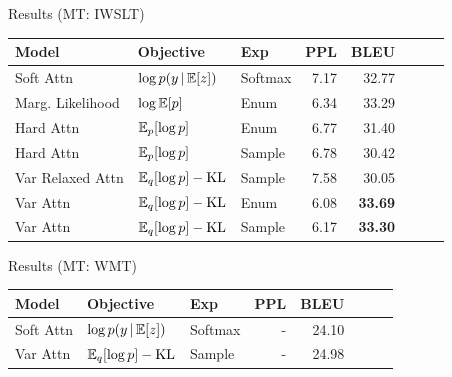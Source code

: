\begin{frame}{Results (MT: IWSLT)}
\begin{table}
  \centering
  \begin{tabular}{lllrrrrr}
    \toprule
    Model & Objective & Exp  & PPL &  BLEU \\
    \midrule
  Soft Attn & $\log p(y \,|\, \mathbb{E}[z])$ & Softmax & 7.17 &  32.77 \\
  Marg. Likelihood & $\log \mathbb{E}[p]$ &  Enum & 6.34  & 33.29\\
  Hard Attn  & $\mathbb{E}_p[\log p]$ & Enum & 6.77 &  31.40\\
  Hard Attn  & $\mathbb{E}_p[\log p]$  & Sample &  6.78 &   30.42\\
  Var Relaxed Attn& $\mathbb{E}_q[\log p] - \operatorname*{KL}$ & Sample & 7.58	 & 30.05 \\
  Var Attn  & $\mathbb{E}_q[\log p] - \operatorname*{KL}$ & Enum & 6.08&  \textbf{33.69} \\
  Var Attn &  $\mathbb{E}_q[\log p] - \operatorname*{KL}$ &Sample& 6.17&  \textbf{33.30} \\
    \bottomrule
  \end{tabular}

\end{table}
\end{frame}

\begin{frame}{Results (MT: WMT)}
\begin{table}
  \centering
  \begin{tabular}{lllrrrrr}
    \toprule
    Model & Objective & Exp  & PPL &  BLEU \\
    \midrule
  Soft Attn & $\log p(y \,|\, \mathbb{E}[z])$ & Softmax & - &  24.10 \\
  Var Attn &  $\mathbb{E}_q[\log p] - \operatorname*{KL}$ &Sample& - &  24.98 \\
    \bottomrule
  \end{tabular}

\end{table}
\end{frame}

